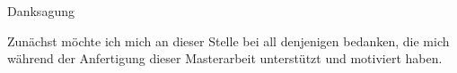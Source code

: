 

\vspace*{\fill}

\begin{center}


\begin{LARGE}
Danksagung
\end{LARGE}

\hspace{5cm}

Zunächst möchte ich mich an dieser Stelle bei all denjenigen bedanken, die mich während der Anfertigung dieser Masterarbeit unterstützt und motiviert haben.


\end{center}


\vspace*{\fill}